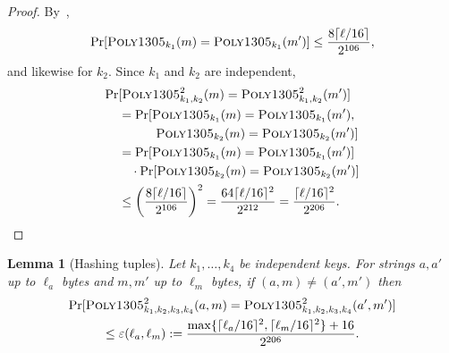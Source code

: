 \documentclass[draft]{article}
\newtheorem{lemma}{Lemma}
\DeclareRobustCommand{\operatorsc}[1]{{%
  \ifmmode\let\next=\operatorname\else\let\next=\relax\fi\next{\textsc{#1}}}}
\def\Poly#1/{\operatorsc{Poly#1}}
\newcommand{\collisionbound}{\varepsilon}
\begin{document}
\begin{proof}
  By~\cite[Theorem~3.3]{bernstein2005poly1305},
  \[
    \Pr[\Poly1305/_{k_1}(m) = \Poly1305/_{k_1}(m')]
    \leq \frac{8\lceil\ell/16\rceil}{2^{106}},
  \]
   and likewise for $k_2$.
  Since $k_1$ and $k_2$ are independent,
  \begin{align*}
    \Pr&[\Poly1305/^2_{k_1,k_2}(m) = \Poly1305/^2_{k_1,k_2}(m')] \\
    &= \Pr[\Poly1305/_{k_1}(m) = \Poly1305/_{k_1}(m'), \\
    &\qquad\quad\Poly1305/_{k_2}(m) = \Poly1305/_{k_2}(m')] \\
    &= \Pr[\Poly1305/_{k_1}(m) = \Poly1305/_{k_1}(m')] \\
    &\quad
       \cdot
       \Pr[\Poly1305/_{k_2}(m) = \Poly1305/_{k_2}(m')] \\
    &\leq \biggl(\frac{8\lceil\ell/16\rceil}{2^{106}}\biggr)^2
     = \frac{64\lceil\ell/16\rceil^2}{2^{212}}
     = \frac{\lceil\ell/16\rceil^2}{2^{206}}.
    \qedhere
  \end{align*}
\end{proof}

\begin{lemma}[Hashing tuples]\label{lem-hash-tuple}
  Let $k_1, \dotsc, k_4$ be independent \Poly1305/ keys.
  For strings $a, a'$ up to $\ell_a$ bytes and $m, m'$ up to $\ell_m$
   bytes, if $(a, m) \ne (a', m')$ then
%
  \begin{multline*}
    \Pr[\Poly1305/^2_{k_1,k_2,k_3,k_4}(a, m)
        = \Poly1305/^2_{k_1,k_2,k_3,k_4}(a', m')] \\
    \leq \collisionbound(\ell_a, \ell_m)
    := \frac{\max\{\lceil\ell_a/16\rceil^2, \lceil\ell_m/16\rceil^2\}
             + 16}
            {2^{206}}.
  \end{multline*}
\end{lemma}
\end{document}
